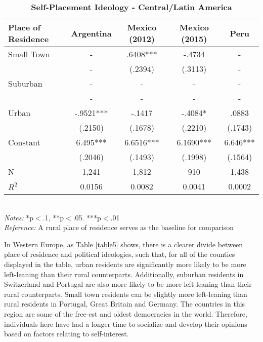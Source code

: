 \documentclass[12pt, titlepage]{article}
\newcommand\e{\emph}
\newcommand\tb{\textbf}
\begin{document}
\begin{singlespace}
	\begin{table}[H]
		\centering
		\caption{\tb{Self-Placement Ideology - Central/Latin America}}
		\begin{tabulary}{\linewidth}{l c c c c}
			\\
			\hline
			\tb{Place of Residence}&\tb{Argentina}&\tb{Mexico (2012)}&\tb{Mexico (2015)} &\tb{Peru}\\
			\hline
			Small Town  & -    & .6408***   &-.4734    & -   \\      
			& -  & (.2394) & (.3113)    & -    \\
			Suburban    & -    & -   & -   & -    \\ 
			& -     & -    & -   & -    \\
			Urban   & -.9521*** & -.1417   & -.4084*   & .0883  \\
			& (.2150)   &(.1678)   & (.2210)  & (.1743)      \\
			Constant   & 6.495*** & 6.6516*** & 6.1690*** & 6.646***   \\
			&(.2046)&(.1493)&(.1998)&(.1564) \\
			N  & 1,241 &1,812   & 910 & 1,438   \\
			$R^2$ & 0.0156   &0.0082   &0.0041 &0.0002     \\
			\hline                   
		\end{tabulary} 
		\\
		\e{Notes:} *p$<$.1, **p$<$.05. ***p$<$.01 \\
		\e{Reference:} A rural place of residence serves as the baseline for comparison
		\label{table4}
	\end{table}
\end{singlespace}

In Western Europe, as Table \ref{table5} shows, there is a clearer divide between place of residence and political ideologies, such that, for all of the counties displayed in the table, urban residents are significantly more likely to be more left-leaning than their rural counterparts. Additionally, suburban residents in Switzerland and Portugal are also more likely to be more left-leaning than their rural counterparts. Small town residents can be slightly more left-leaning than rural residents in Portugal, Great Britain and Germany. The countries in this region are some of the free-est and oldest democracies in the world. Therefore, individuals here have had a longer time to socialize and develop their opinions based on factors relating to self-interest. 
\end{document}
